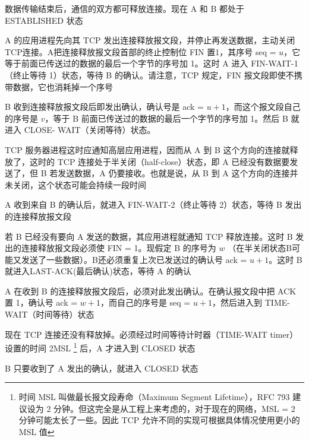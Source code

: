 \documentclass[cs4size,a4paper,10pt]{ctexart}
\begin{document}
	数据传输结束后，通信的双方都可释放连接。现在 A 和 B 都处于 ESTABLISHED 状态

	A 的应用进程先向其 TCP 发出连接释放报文段，并停止再发送数据，主动关闭 TCP连接。A把连接释放报文段首部的终止控制位 FIN 置1，其序号 seq = $u$，它等于前面已传送过的数据的最后一个字节的序号加 1。这时 A 进入 FIN-WAIT-1（终止等待 1）状态，等待 B 的确认。请注意，TCP 规定，FIN 报文段即使不携带数据，它也消耗掉一个序号

	B 收到连接释放报文段后即发出确认，确认号是 ack = $u + 1$，而这个报文段自己的序号是 $v$，等于 B 前面已传送过的数据的最后一个字节的序号加 1。然后 B 就进入 CLOSE- WAIT（关闭等待）状态。

	TCP 服务器进程这时应通知高层应用进程，因而从 A 到 B 这个方向的连接就释放了，这时的 TCP 连接处于半关闭（half-close）状态，即 A 已经没有数据要发送了，但 B 若发送数据，A 仍要接收。也就是说，从 B 到 A 这个方向的连接并未关闭，这个状态可能会持续一段时间

	A 收到来自 B 的确认后，就进入 FIN-WAIT-2（终止等待 2）状态，等待 B 发出的连接释放报文段

	若 B 已经没有要向 A 发送的数据，其应用进程就通知 TCP 释放连接。这时 B 发出的连接释放报文段必须使 FIN = 1。现假定 B 的序号为 $w$ （在半关闭状态B可能又发送了一些数据）。B还必须重复上次已发送过的确认号 ack = $u + 1$。这时 B 就进入LAST-ACK(最后确认)状态，等待 A 的确认

	A 在收到 B 的连接释放报文段后，必须对此发出确认。在确认报文段中把 ACK 置 1，确认号 ack = $w + 1$，而自己的序号是 seq = $u + 1$，然后进入到 TIME-WAIT（时间等待）状态

	现在 TCP 连接还没有释放掉。必须经过时间等待计时器（TIME-WAIT timer）设置的时间 2MSL \footnote{时间 MSL 叫做最长报文段寿命（Maximum Segment Lifetime），RFC 793 建议设为 2 分钟。但这完全是从工程上来考虑的，对于现在的网络，MSL = 2 分钟可能太长了一些。因此 TCP 允许不同的实现可根据具体情况使用更小的 MSL 值}
	后，A 才进入到 CLOSED 状态

	B 只要收到了 A 发出的确认，就进入 CLOSED 状态
\end{document}
